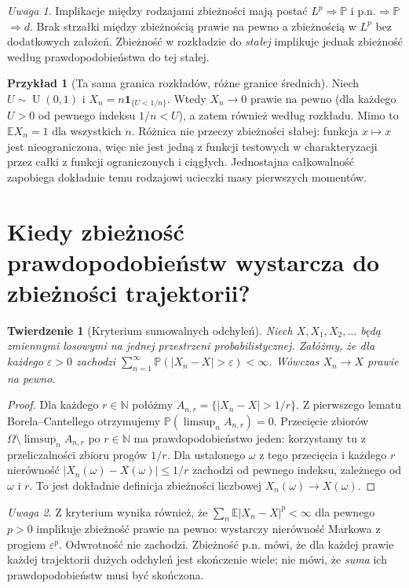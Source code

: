 \documentclass[11pt,a4paper,oneside]{report}
\numberwithin{equation}{chapter}
\theoremstyle{plain}
\newtheorem{twierdzenie}{Twierdzenie}[chapter]
\theoremstyle{definition}
\newtheorem{przyklad}{Przykład}[chapter]
\theoremstyle{remark}
\newtheorem{uwaga}{Uwaga}[chapter]
\newcommand{\N}{\mathbb{N}}
\newcommand{\Prob}{\mathbb{P}}
\newcommand{\E}{\mathbb{E}}
\newcommand{\ind}[1]{\mathbf{1}_{#1}}
\newcommand{\Unif}{\operatorname{U}}
\begin{document}
\begin{uwaga}
Implikacje między rodzajami zbieżności mają postać
$L^p\Rightarrow\Prob$ i p.n.$\Rightarrow\Prob$
$\Rightarrow d$. Brak strzałki między zbieżnością
prawie na pewno a zbieżnością w $L^p$ bez dodatkowych
założeń. Zbieżność w rozkładzie do \emph{stałej}
implikuje jednak zbieżność według prawdopodobieństwa
do tej stałej.
\end{uwaga}


\begin{przyklad}[Ta sama granica rozkładów, różne granice średnich]
Niech $U\sim\Unif(0,1)$ i
$X_n=n\ind{\{U<1/n\}}$. Wtedy $X_n\to0$
prawie na pewno (dla każdego $U>0$ od pewnego
indeksu $1/n<U$), a zatem również według rozkładu.
Mimo to $\E X_n=1$ dla wszystkich $n$.
Różnica nie przeczy zbieżności słabej: funkcja
$x\mapsto x$ jest nieograniczona, więc nie jest
jedną z funkcji testowych w charakteryzacji przez
całki z funkcji ograniczonych i ciągłych.
Jednostajna całkowalność zapobiega dokładnie temu
rodzajowi ucieczki masy pierwszych momentów.
\end{przyklad}

\section{Kiedy zbieżność prawdopodobieństw wystarcza do zbieżności trajektorii?}

\begin{twierdzenie}[Kryterium sumowalnych odchyleń]
Niech $X,X_1,X_2,\ldots$ będą zmiennymi losowymi na jednej
przestrzeni probabilistycznej. Załóżmy, że dla każdego
$\varepsilon>0$ zachodzi
$\sum_{n=1}^\infty\Prob(|X_n-X|>\varepsilon)<\infty$.
Wówczas $X_n\to X$ prawie na pewno.
\end{twierdzenie}
\begin{proof}
Dla każdego $r\in\N$ połóżmy
$A_{n,r}=\{|X_n-X|>1/r\}$. Z pierwszego lematu
Borela--Cantellego otrzymujemy $\Prob(\limsup_n A_{n,r})=0$.
Przecięcie zbiorów
$\Omega\setminus\limsup_n A_{n,r}$ po $r\in\N$
ma prawdopodobieństwo jeden: korzystamy tu z przeliczalności
zbioru progów $1/r$. Dla ustalonego $\omega$ z tego
przecięcia i każdego $r$ nierówność
$|X_n(\omega)-X(\omega)|\leq1/r$ zachodzi od pewnego
indeksu, zależnego od $\omega$ i $r$. To jest dokładnie
definicja zbieżności liczbowej $X_n(\omega)\to X(\omega)$.
\end{proof}

\begin{uwaga}
Z kryterium wynika również, że
$\sum_n\E|X_n-X|^p<\infty$ dla pewnego $p>0$
implikuje zbieżność prawie na pewno: wystarczy
nierówność Markowa z progiem $\varepsilon^p$.
Odwrotność nie zachodzi. Zbieżność p.n. mówi,
że dla każdej prawie każdej trajektorii dużych odchyleń
jest skończenie wiele; nie mówi, że \emph{suma}
ich prawdopodobieństw musi być skończona.
\end{uwaga}
\end{document}
